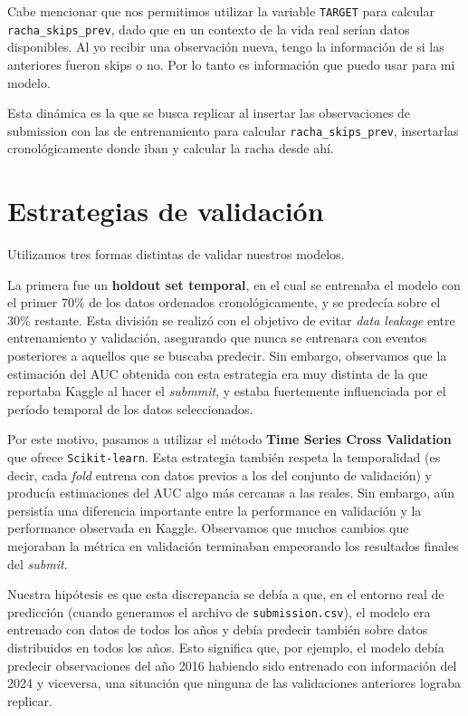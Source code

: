 \documentclass{article}
\begin{document}
Cabe mencionar que nos permitimos utilizar la variable \texttt{TARGET} para calcular \texttt{racha\_skips\_prev}, dado que en un contexto de la vida real serían datos disponibles. Al yo recibir una observación nueva, tengo la información de si las anteriores fueron skips o no. Por lo tanto es información que puedo usar para mi modelo.

Esta dinámica es la que se busca replicar al insertar las observaciones de submission con las de entrenamiento para calcular \texttt{racha\_skips\_prev}, insertarlas cronológicamente donde iban y calcular la racha desde ahí.

\section*{Estrategias de validación}

Utilizamos tres formas distintas de validar nuestros modelos.

La primera fue un \textbf{holdout set temporal}, en el cual se entrenaba el modelo con el primer 70\% de los datos ordenados cronológicamente, y se predecía sobre el 30\% restante. Esta división se realizó con el objetivo de evitar \textit{data leakage} entre entrenamiento y validación, asegurando que nunca se entrenara con eventos posteriores a aquellos que se buscaba predecir. Sin embargo, observamos que la estimación del AUC obtenida con esta estrategia era muy distinta de la que reportaba Kaggle al hacer el \textit{submmit}, y estaba fuertemente influenciada por el período temporal de los datos seleccionados.

Por este motivo, pasamos a utilizar el método \textbf{Time Series Cross Validation} que ofrece \texttt{Scikit-learn}. Esta estrategia también respeta la temporalidad (es decir, cada \textit{fold} entrena con datos previos a los del conjunto de validación) y producía estimaciones del AUC algo más cercanas a las reales. Sin embargo, aún persistía una diferencia importante entre la performance en validación y la performance observada en Kaggle. Observamos que muchos cambios que mejoraban la métrica en validación terminaban empeorando los resultados finales del \textit{submit}.

Nuestra hipótesis es que esta discrepancia se debía a que, en el entorno real de predicción (cuando generamos el archivo de \texttt{submission.csv}), el modelo era entrenado con datos de todos los años y debía predecir también sobre datos distribuidos en todos los años. Esto significa que, por ejemplo, el modelo debía predecir observaciones del año 2016 habiendo sido entrenado con información del 2024 y viceversa, una situación que ninguna de las validaciones anteriores lograba replicar.
\end{document}
